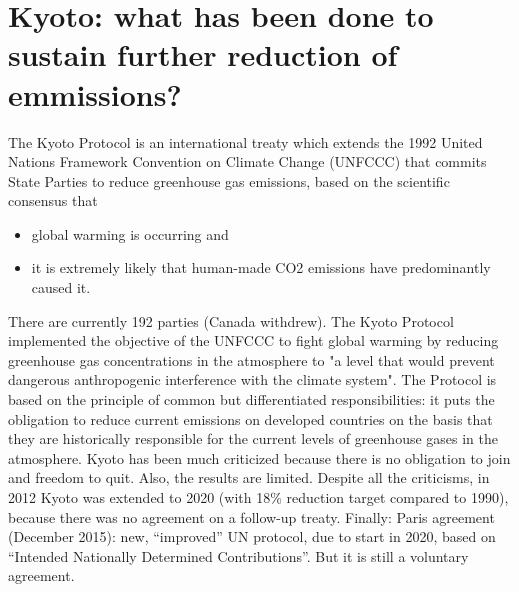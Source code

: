 \section{Kyoto: what has been done to sustain further reduction of emmissions?}
The Kyoto Protocol is an international treaty which extends the 1992 United Nations Framework Convention on Climate Change (UNFCCC) that commits State Parties to reduce greenhouse gas emissions, based on the scientific consensus that 
\begin{itemize}
\item global warming is occurring and 
\item it is extremely likely that human-made CO2 emissions have predominantly caused it. 
\end{itemize} 
There are currently 192 parties (Canada withdrew). The Kyoto Protocol implemented the objective of the UNFCCC to fight global warming by reducing greenhouse gas concentrations in the atmosphere to "a level that would prevent dangerous anthropogenic interference with the climate system". The Protocol is based on the principle of common but differentiated responsibilities: it puts the obligation to reduce current emissions on developed countries on the basis that they are historically responsible for the current levels of greenhouse gases in the atmosphere. Kyoto has been much criticized because there is no obligation to join and freedom to quit. Also, the results are limited. Despite all the criticisms, in 2012 Kyoto was extended to 2020 (with 18\% reduction target compared to 1990), because there was no agreement on a follow-up treaty. Finally: Paris agreement (December 2015): new, “improved” UN protocol, due to start in 2020, based on “Intended Nationally Determined Contributions”. But it is still a voluntary agreement.

\clearpage